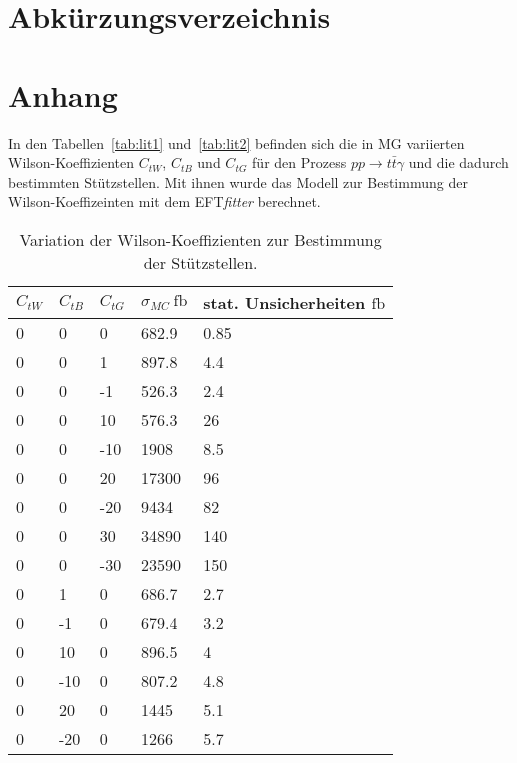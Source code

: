 \chapter{Abkürzungsverzeichnis}

\chapter{Anhang}
In den Tabellen~\ref{tab:lit1} und~\ref{tab:lit2} befinden sich die in MG variierten Wilson-Koeffizienten $C_{tW}$, $C_{tB}$ und $C_{tG}$ für den Prozess $pp\rightarrow t\bar{t}\gamma$ und die dadurch bestimmten Stützstellen. Mit ihnen wurde das Modell zur Bestimmung der Wilson-Koeffizeinten mit dem EFT\textit{fitter} berechnet.
\begin{table}
  \centering
  \caption{Variation der Wilson-Koeffizienten zur Bestimmung der Stützstellen.}
  \begin{tabular}{lllll}
    \toprule
    $C_{tW}$ & $C_{tB}$ & $C_{tG}$ & $\sigma_{MC}~\si{\femto\barn}$ & stat. Unsicherheiten $\si{\femto\barn}$\\
		\midrule
  0    &     0      &     0      &      682.9   &    0.85\\
  0    &     0      &     1      &      897.8   &    4.4\\
  0    &     0      &     -1     &      526.3   &    2.4\\
  0    &     0      &     10     &      576.3   &    26\\
  0    &     0      &     -10    &      1908    &    8.5\\
  0    &     0      &     20     &      17300   &    96\\
  0    &     0      &     -20    &      9434    &    82\\
  0    &     0      &     30     &      34890   &    140\\
  0    &     0      &     -30    &      23590   &    150\\
  0    &     1      &     0      &      686.7   &    2.7\\
  0    &     -1     &     0      &      679.4   &    3.2\\
  0    &     10     &     0      &      896.5   &    4\\
  0    &     -10    &     0      &      807.2   &    4.8\\
  0    &     20     &     0      &      1445    &    5.1\\
  0    &     -20    &     0      &      1266    &    5.7\\

\end{tabular}
\end{table}
